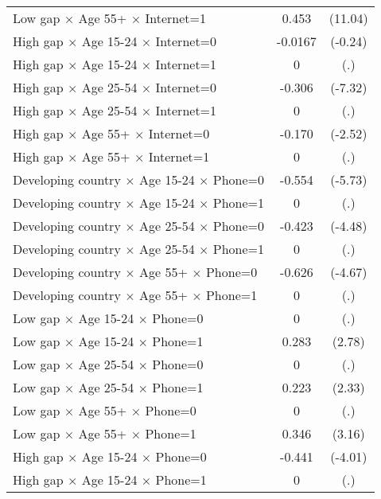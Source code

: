 {\begin{longtable}{l*{1}{cc}}
Low gap $\times$ Age 55+ $\times$ Internet=1&       0.453\sym{***}&     (11.04)\\
High gap $\times$ Age 15-24 $\times$ Internet=0&     -0.0167         &     (-0.24)\\
High gap $\times$ Age 15-24 $\times$ Internet=1&           0         &         (.)\\
High gap $\times$ Age 25-54 $\times$ Internet=0&      -0.306\sym{***}&     (-7.32)\\
High gap $\times$ Age 25-54 $\times$ Internet=1&           0         &         (.)\\
High gap $\times$ Age 55+ $\times$ Internet=0&      -0.170\sym{*}  &     (-2.52)\\
High gap $\times$ Age 55+ $\times$ Internet=1&           0         &         (.)\\
Developing country $\times$ Age 15-24 $\times$ Phone=0&      -0.554\sym{***}&     (-5.73)\\
Developing country $\times$ Age 15-24 $\times$ Phone=1&           0         &         (.)\\
Developing country $\times$ Age 25-54 $\times$ Phone=0&      -0.423\sym{***}&     (-4.48)\\
Developing country $\times$ Age 25-54 $\times$ Phone=1&           0         &         (.)\\
Developing country $\times$ Age 55+ $\times$ Phone=0&      -0.626\sym{***}&     (-4.67)\\
Developing country $\times$ Age 55+ $\times$ Phone=1&           0         &         (.)\\
Low gap $\times$ Age 15-24 $\times$ Phone=0&           0         &         (.)\\
Low gap $\times$ Age 15-24 $\times$ Phone=1&       0.283\sym{**} &      (2.78)\\
Low gap $\times$ Age 25-54 $\times$ Phone=0&           0         &         (.)\\
Low gap $\times$ Age 25-54 $\times$ Phone=1&       0.223\sym{*}  &      (2.33)\\
Low gap $\times$ Age 55+ $\times$ Phone=0&           0         &         (.)\\
Low gap $\times$ Age 55+ $\times$ Phone=1&       0.346\sym{**} &      (3.16)\\
High gap $\times$ Age 15-24 $\times$ Phone=0&      -0.441\sym{***}&     (-4.01)\\
High gap $\times$ Age 15-24 $\times$ Phone=1&           0         &         (.)\\

\end{longtable}}
